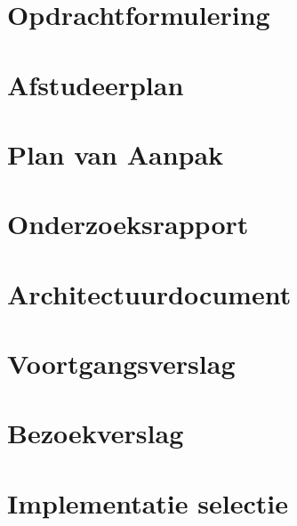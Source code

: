 \begin{appendices}
  \renewcommand\thesection{\Roman{section}}
  \renewcommand\thesubsection{\thesection.\roman{subsection}}

  \section{Opdrachtformulering}\label{appendix:opdrachtformulering}
  

  \section{Afstudeerplan}\label{appendix:afstudeerplan}
  

  \section{Plan van Aanpak}
  \label{appendix:pva}

  \section{Onderzoeksrapport}\label{appendix:onderzoeksrapport}
  


  \section{Architectuurdocument}\label{appendix:architectuur}
  
    
  \section{Voortgangsverslag}
  

  \section{Bezoekverslag}
  

  \section{Implementatie selectie}
  
\end{appendices}